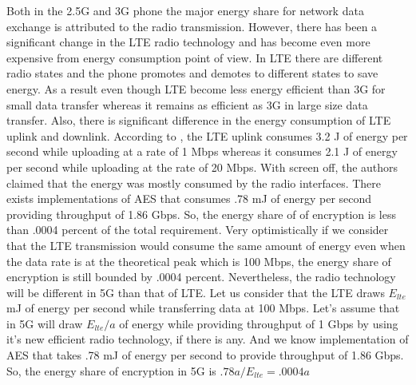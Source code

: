 Both in the 2.5G and 3G phone the major energy share for network data exchange is attributed to the radio transmission. However, there has been a significant change in the LTE radio technology and has become even more expensive from energy consumption point of view. In LTE there are different radio states and the phone promotes and demotes to different states to save energy. As a result even though LTE become less energy efficient than 3G for small data transfer whereas it remains as efficient as 3G in large size data transfer. Also, there is significant difference in the energy consumption of LTE uplink and downlink. According to \cite{Mobisys_2012}, the LTE uplink consumes 3.2 J of energy per second while uploading at a rate of 1 Mbps whereas it consumes 2.1 J of energy per second while uploading at the rate of 20 Mbps. With screen off, the authors claimed that the energy was mostly consumed by the radio interfaces. There exists implementations of AES that consumes .78 mJ of energy per second providing throughput of 1.86 Gbps. So, the energy share of of encryption is less than .0004 percent of the total requirement. Very optimistically if we consider that the LTE transmission would consume the same amount of energy even when the data rate is at the theoretical peak which is 100 Mbps, the energy share of encryption is still bounded by .0004 percent. Nevertheless, the radio technology will be different in 5G than that of LTE. Let us consider that the LTE draws $E_{lte}$ mJ of energy per second while transferring data at 100 Mbps. Let's assume that in 5G will draw $E_{lte}/a$ of energy while providing throughput of 1 Gbps by using it's new efficient radio technology, if there is any. And we know implementation of AES that takes .78 mJ of energy per second to provide throughput of 1.86 Gbps. So, the energy share of encryption in 5G is $.78a/E_{lte} = .0004a$





\label{sec:overall_comparison}

\label{sec:aes}

